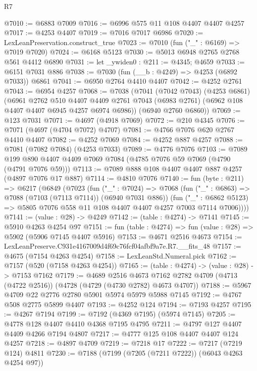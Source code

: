 \begin{lexlean}{R7}
\begin{coremodule}
@7010 := @6883 @7009
@7016 := @6996 @575 @11 @108 @4407 @4407 @4257
@7017 := @4253 @4407
@7019 := @7016 @7017 @6986
@7020 := LexLeanPreservation.construct_true
@7023 := @7010 (fun ("_" : @6169) => @7019 @7020)
@7024 := @6168 @5123
@7030 := @5013 @6948 @2765 @2768 @561 @4412 @6890
@7031 := let _ywiden0 : @211 := @4345; @4659
@7033 := @6151 @7031 @886
@7038 := @7030 (fun (__b : @4249) => @4253 (@6892 @7033)) @6861
@7041 := @6950 @2764 @4410 @4407
@7042 := @4252 @2761
@7043 := @6954 @4257
@7068 := @7038
    (@7041
      (@7042 @7043)
      (@4253 @6861)
      (@6961
        @2762
        @510
        @4407
        @4409
        @2761
        @7043
        (@6983 @2761)
        (@6962 @108 @4407 @4407 @6945 @4257 @6974 @6986))
      (@6940 @2760 @6860))
@7069 := @123 @7031
@7071 := @4697 (@4918 @7069)
@7072 := @210 @4345
@7076 := @7071 (@4697 (@4704 @7072) @4707)
@7081 := @4766 @7076 @620 @2767 @4410 @4407
@7082 := @4252 @7069
@7084 := @4252 @887 @4257
@7088 := @7081 (@7082 @7084) (@4253 @7033)
@7089 := @4776 @7076
@7103 := @7089 @199 @890 @4407 @4409 @7069 @7084 (@4785 @7076 @59 @7069 (@4790 (@4791 @7076 @59)))
@7113 := @7089 @888 @108 @4407 @4407 @887 @4257 (@4897 @7076 @17 @887)
@7114 := @4810 @7076
@7140 := fun (byte : @211) =>
  @6217
    (@6849
      (@7023
        (fun ("_" : @7024) =>
        @7068
          (fun ("_" : @6863) => @7088 (@7103 (@7113 @7114)) (@6940 @7031 @886))
          (fun ("_" : @6862 @5123) =>
          @5805 @7076 @558 @11 @108 @4407 @4407 @4257 @7003 @7114 @7006))))
@7141 := (value : @28) -> @4249
@7142 := (table : @4274) -> @7141
@7145 := @5910 @4263 @4254 @97
@7151 := fun (table : @4274) => fun (value : @28) => @5902 (@5906 @7145 @4407 @5916)
@7153 := @4671 @2516 @4673
@7154 := LexLeanPreserve.C931e4167009d4f69c76fcf04afbf9a7e.R7.__fits_48
@7157 := @4675 (@7154 @4263 @4254)
@7158 := LexLeanStd.Numeral.pick
@7162 := @7157 (@520 (@7158 @4263 @4254))
@7165 := (table : @4274) -> (value : @28) -> @7153 @7162
@7179 := @4689
    @2516
    @4673
    @7162
    @2782
    @4709
    (@4713 (@4722 @2516))
    (@4728 (@4729 (@4730 @2782) @4673 @4707))
@7188 := @5967 @4709 @22 @2776 @2780 @5901 @5974 @5979 @5988 @7145
@7192 := @4767 @508 @2775 @5899 @4407
@7193 := @4252 @124
@7194 := @7193 @4257
@7195 := @4267 @7194
@7199 := @7192 (@4369 @7195) (@5974 @7145)
@7205 := @4778 @128 @4407 @4410 @4368 @7195 @4795
@7211 := @4797 @127 @4407 @4409 @4266 @7194 @4807
@7217 := @4777 @125 @108 @4407 @4407 @124 @4257
@7218 := @4897 @4709
@7219 := @7218 @17
@7222 := @7217 (@7219 @124) @4811
@7230 := @7188 (@7199 (@7205 (@7211 @7222)) (@6043 @4263 @4254 @97))

\end{coremodule}
\end{lexlean}
